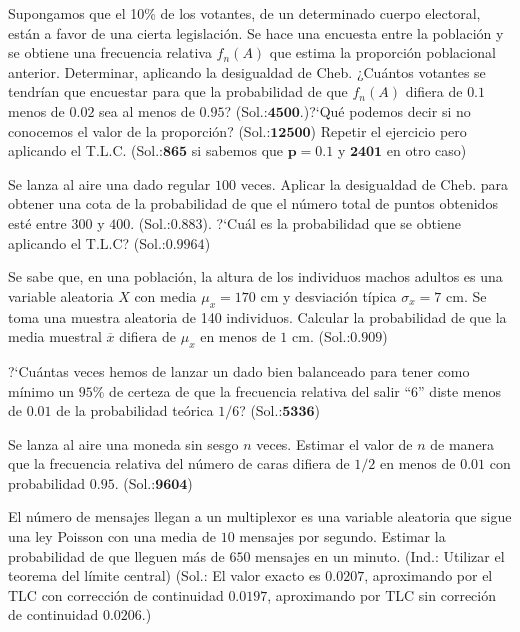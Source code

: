\documentclass[12pt]{article}
\begin{document}
\begin{prob}   Supongamos que  el 10\% de los votantes,
 de un determinado cuerpo electoral, están a favor de una cierta legislación. Se hace  una
encuesta entre la población y se obtiene una frecuencia relativa $f_n(A)$ que estima la
proporción poblacional anterior. Determinar, aplicando la desigualdad de Cheb. ¿Cuántos
votantes se tendrían que encuestar para que  la probabilidad de que $f_n(A)$ difiera de $
0.1$ menos de $0.02$ sea al menos de $0.95$? (Sol.:$\mathbf{4500}$.)?`Qué podemos decir si no
conocemos el valor de la proporción? (Sol.:$\mathbf{12500}$) Repetir el ejercicio pero
aplicando el T.L.C. (Sol.:$\mathbf{865}$ si sabemos que  $\mathbf{p=0.1}$ y $\mathbf{2401}$
en otro caso)
\end{prob}

\begin{prob}  Se lanza al aire una dado regular $100$ veces. Aplicar la desigualdad de Cheb.
para obtener una cota de la probabilidad de  que el número total de puntos obtenidos esté
entre $300$ y $400$. (Sol.:$\mathbf{0.883}$). ?`Cuál es la probabilidad que se obtiene
aplicando el T.L.C? (Sol.:$\mathbf{0.9964}$)
\end{prob}

\begin{prob} Se sabe que, en una población, la altura de los individuos machos adultos es
 una variable aleatoria $X$ con media $\mu_x = 170$ cm y desviación típica
 $\sigma_x = 7 $ cm. Se toma una muestra aleatoria  de 140 individuos.
  Calcular la probabilidad de que la media muestral
$\overline{x}$ difiera de $\mu_x$ en menos de $1$ cm. (Sol.:$\mathbf{0.909}$)
\end{prob}
\begin{prob}  ?`Cuántas veces hemos de lanzar un dado bien balanceado para tener como mínimo un  $95$\% de  certeza de que la frecuencia
 relativa del salir ``6'' diste menos de $0.01$ de la
probabilidad teórica $1/6$? (Sol.:$\mathbf{5336}$)
\end{prob}
\begin{prob}
Se lanza al aire una moneda sin sesgo $n$ veces. Estimar el valor de  $n$ de manera que la
frecuencia relativa del número de caras difiera de $1/2$ en menos de $0.01$ con
probabilidad $0.95$. (Sol.:$\mathbf{9604}$)
\end{prob}

\begin{prob} El número de mensajes llegan a un multiplexor es una variable aleatoria que
sigue una ley  Poisson con una  media de $10$ mensajes por segundo. Estimar la probabilidad
de  que lleguen más de $650$ mensajes en un minuto. (Ind.: Utilizar el teorema del límite
central) (Sol.: El valor exacto es $\mathbf{0.0207}$, aproximando por el TLC con corrección de continuidad $\mathbf{0.0197}$, aproximando por TLC sin correción de continuidad  $\mathbf{0.0206}$.)
\end{prob}
\end{document}

